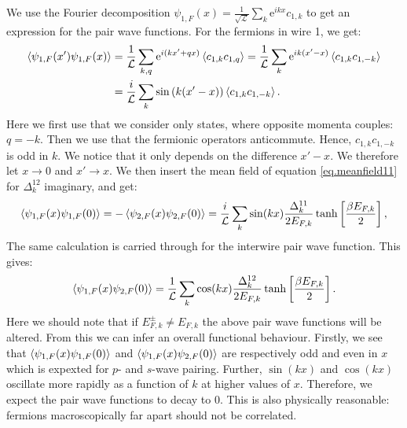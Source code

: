 We use the Fourier decomposition $\psi_{1,F}(x) = \frac{1}{\sqrt{\mathcal{L}}} \sum_k \text{e}^{ikx} c_{1,k}$ to get an expression for the pair wave functions. For the fermions in wire 1, we get:
\begin{align}
\braket{\psi_{1,F}(x')\psi_{1,F}(x)} 
&= \frac{1}{\mathcal{L}} \sum_{k,q} \text{e}^{i(kx' + qx)}\braket{c_{1,k}c_{1,q}} = \frac{1}{\mathcal{L}} \sum_{k} \text{e}^{ik(x' - x)}\braket{c_{1,k}c_{1,-k}} \nonumber \\
&= \frac{i}{\mathcal{L}} \sum_{k} \sin\left(k(x' - x)\right)\braket{c_{1,k}c_{1,-k}}. \nonumber 
\end{align}
Here we first use that we consider only states, where opposite momenta couples: $q = -k$. Then we use that the fermionic operators anticommute. Hence, $c_{1,k}c_{1,-k}$ is odd in $k$. We notice that it only depends on the difference $x' - x$. We therefore let $x \to 0$ and $x' \to x$. We then insert the mean field of equation \eqref{eq.meanfield11} for $\Delta^{12}_k$ imaginary, and get:
\begin{equation}
\braket{\psi_{1,F}(x)\psi_{1,F}(0)} = - \braket{\psi_{2,F}(x)\psi_{2,F}(0)} = \frac{i}{\mathcal{L}}\sum_k \sin(kx) \frac{\Delta^{11}_k}{2E_{F,k}}\tanh\left[\frac{ \beta E_{F,k} }{2}\right], 
\label{eq.intrawirepairwavefunction}
\end{equation}
The same calculation is carried through for the interwire pair wave function. This gives:
\begin{equation}
\braket{\psi_{1,F}(x)\psi_{2,F}(0)} = \frac{1}{\mathcal{L}}\sum_k \cos(kx) \frac{\Delta^{12}_k}{2E_{F,k}}\tanh\left[\frac{ \beta E_{F,k} }{2}\right].
\label{eq.interwirepairwavefunction}
\end{equation} 
Here we should note that if $E^\pm_{F,k} \neq E_{F,k}$ the above pair wave functions will be altered. From this we can infer an overall functional behaviour. Firstly, we see that $\braket{\psi_{1,F}(x)\psi_{1,F}(0)}$ and $\braket{\psi_{1,F}(x)\psi_{2,F}(0)}$ are respectively odd and even in $x$ which is expexted for $p$- and $s$-wave pairing. Further, $\sin(kx)$ and $\cos(kx)$ oscillate more rapidly as a function of $k$ at higher values of $x$. Therefore, we expect the pair wave functions to decay to 0. This is also physically reasonable: fermions macroscopically far apart should not be correlated. 

